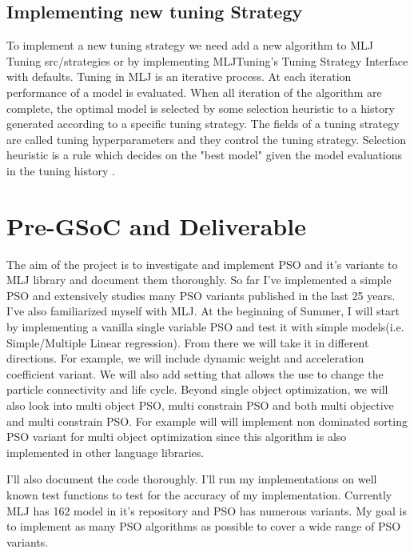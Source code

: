 \documentclass{article}
\begin{document}
\subsection{Implementing new tuning Strategy}
To implement a new tuning strategy we need add a new algorithm to MLJ Tuning src/strategies or by implementing MLJTuning's Tuning Strategy Interface with defaults. Tuning in MLJ is an iterative process. At each iteration performance of a model is evaluated. When all iteration of the algorithm are complete, the optimal model is selected by some selection heuristic to a history generated according to a specific tuning strategy. The fields of a tuning strategy are called tuning hyperparameters and they control the tuning strategy. Selection heuristic is a rule which decides on the "best model" given the model evaluations in the tuning history \cite{turing}.

\section{Pre-GSoC and Deliverable}
The aim of the project is to investigate and implement PSO and it's variants to MLJ library and document them thoroughly. So far I've implemented a simple PSO and extensively studies many PSO variants published in the last 25 years. I've also familiarized myself with MLJ. At the beginning of Summer, I will start by implementing a vanilla single variable PSO and test it with simple models(i.e. Simple/Multiple Linear regression). From there we will take it in different directions. For example, we will include dynamic weight and acceleration coefficient variant. We will also add setting that allows the use to change the particle connectivity and life cycle. Beyond single object optimization, we will also look into multi object PSO, multi constrain PSO and both multi objective and multi constrain PSO. For example will will implement non dominated sorting PSO variant for multi object optimization since this algorithm is also implemented in other language libraries.

I'll also document the code thoroughly. I'll run my implementations on well known test functions to test for the accuracy of my implementation. Currently MLJ has 162 model in it's repository and PSO has numerous variants. My goal is to implement as many PSO algorithms as possible to cover a wide range of PSO variants.
\end{document}
